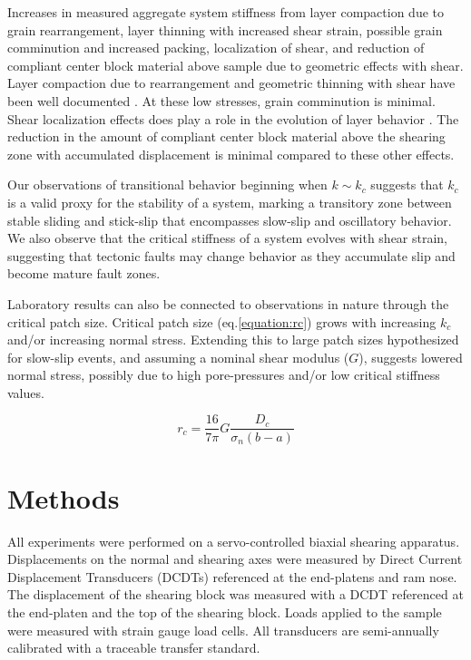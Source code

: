 \documentclass[11pt]{article}
\begin{document}
Increases in measured aggregate system stiffness from layer compaction due to
grain rearrangement, layer thinning with increased shear strain, possible grain
comminution and increased packing, localization of shear, and reduction of
compliant center block material above sample due to geometric effects with
shear. Layer compaction due to rearrangement and geometric thinning with shear
have been well documented \cite{Scott:1994}.  At these low stresses, grain
comminution is minimal. Shear localization effects does play a role in the
evolution of layer behavior \cite{Logan:1992}. The reduction in the amount of
compliant center block material above the shearing zone with accumulated
displacement is minimal compared to these other effects.

Our observations of transitional behavior beginning when $k \sim k_c$ suggests
that $k_c$ is a valid proxy for the stability of a system, marking a transitory
zone between stable sliding and stick-slip that encompasses slow-slip and
oscillatory behavior. We also observe that the critical stiffness of a system
evolves with shear strain, suggesting that tectonic faults may change behavior
as they accumulate slip and become mature fault zones.

Laboratory results can also be connected to observations in nature through the
critical patch size. Critical patch size (eq.\ref{equation:rc}) grows with
increasing $k_c$ and/or increasing normal stress. Extending this to large patch
sizes hypothesized for slow-slip events, and assuming a nominal shear modulus
($G$), suggests lowered normal stress, possibly due to high pore-pressures
and/or low critical stiffness values.

\begin{equation}
    r_c = \frac{16}{7\pi}G \frac{D_c}{\sigma_n (b-a)}
    \label{equation:rc}
\end{equation}

\section{Methods}
All experiments were performed on a servo-controlled biaxial shearing apparatus.
Displacements on the normal and shearing axes were measured by Direct Current
Displacement Transducers (DCDTs) referenced at the end-platens and ram nose. The
displacement of the shearing block was measured with a DCDT referenced at the
end-platen and the top of the shearing block. Loads applied to the sample were
measured with strain gauge load cells. All transducers are semi-annually
calibrated with a traceable transfer standard.
\end{document}

